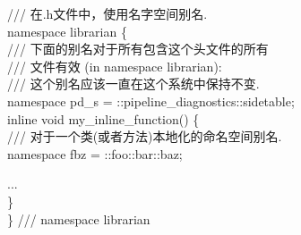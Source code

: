 \documentclass[a4paper,11pt,CJK]{article}
\begin{document}
\begin{CJK}{UTF8}{gbsn}
\begin{enumerate}
{\begin{minipage}{370pt}
    \indent /// 在.h文件中，使用名字空间别名.\\
    namespace librarian \{\\
    /// 下面的别名对于所有包含这个头文件的所有\\
    /// 文件有效 (in namespace librarian):\\
    /// 这个别名应该一直在这个系统中保持不变.\\
    namespace pd\_s = ::pipeline\_diagnostics::sidetable;\\

    inline void my\_inline\_function() \{\\
    /// 对于一个类(或者方法)本地化的命名空间别名.\\
    namespace fbz = ::foo::bar::baz;\par
    \hspace{3ex}  ...\\
    \}\\
\}  /// namespace librarian
\end{minipage}
}

\end{enumerate}

\end{CJK}
\end{document}
